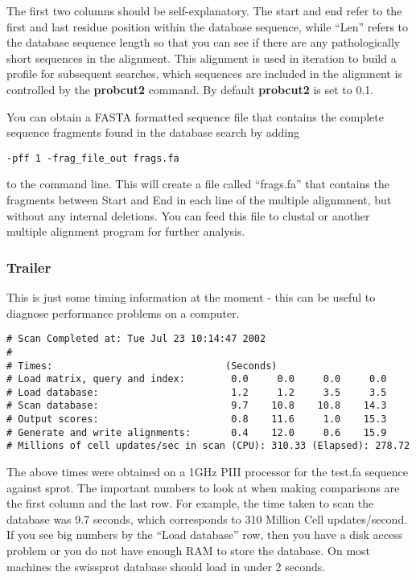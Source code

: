 \documentclass[12pt]{article}
\begin{document}
The first two columns should be self-explanatory.  The start and end
refer to the first and last residue position within the database
sequence, while ``Len'' refers to the database sequence length so that
you can see if there are any pathologically short sequences in the
alignment.  This alignment is used in iteration to build a profile for
subsequent searches, which sequences are included in the alignment is
controlled by the {\bf probcut2} command.  By default {\bf probcut2}
is set to 0.1.

You can obtain a FASTA formatted sequence file that contains the
complete sequence fragments found in the database search by adding

\begin{verbatim}
-pff 1 -frag_file_out frags.fa
\end{verbatim}

to the command line.  This will create a file called ``frags.fa'' that
contains the fragments between Start and End in each line of the
multiple alignmnent, but without any internal deletions. You can feed
this file to clustal or another multiple alignment program for further
analysis.

\subsubsection{Trailer}

This is just some timing information at the moment - this can be
useful to diagnose performance problems on a computer.

\begin{scriptsize}
\begin{verbatim}
# Scan Completed at: Tue Jul 23 10:14:47 2002
# 
# Times:                              (Seconds)
# Load matrix, query and index:        0.0     0.0     0.0     0.0
# Load database:                       1.2     1.2     3.5     3.5
# Scan database:                       9.7    10.8    10.8    14.3
# Output scores:                       0.8    11.6     1.0    15.3
# Generate and write alignments:       0.4    12.0     0.6    15.9
# Millions of cell updates/sec in scan (CPU): 310.33 (Elapsed): 278.72
\end{verbatim}
\end{scriptsize}

The above times were obtained on a 1GHz PIII processor for the test.fa
sequence against sprot.  The important numbers to look at when making
comparisons are the first column and the last row.  For example, the
time taken to scan the database was 9.7 seconds, which corresponds to
310 Million Cell updates/second.  If you see big numbers by the ``Load
database'' row, then you have a disk access problem or you do not have
enough RAM to store the database.  On most machines the swissprot
database should load in under 2 seconds.
\end{document}
